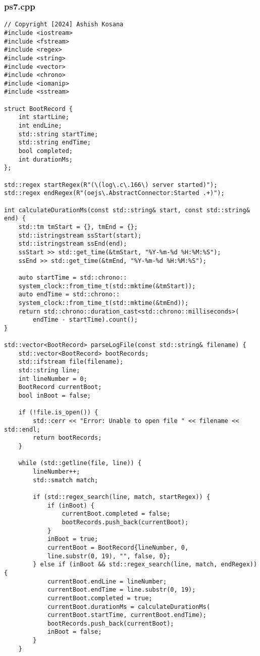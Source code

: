 \documentclass[12pt]{article}
\begin{document}
\subsubsection{ps7.cpp}
\begin{lstlisting}[style=cppcode]
// Copyright [2024] Ashish Kosana
#include <iostream>
#include <fstream>
#include <regex>
#include <string>
#include <vector>
#include <chrono>
#include <iomanip>
#include <sstream>

struct BootRecord {
    int startLine;
    int endLine;
    std::string startTime;
    std::string endTime;
    bool completed;
    int durationMs;
};

std::regex startRegex(R"(\(log\.c\.166\) server started)");
std::regex endRegex(R"(oejs\.AbstractConnector:Started .+)");

int calculateDurationMs(const std::string& start, const std::string& end) {
    std::tm tmStart = {}, tmEnd = {};
    std::istringstream ssStart(start);
    std::istringstream ssEnd(end);
    ssStart >> std::get_time(&tmStart, "%Y-%m-%d %H:%M:%S");
    ssEnd >> std::get_time(&tmEnd, "%Y-%m-%d %H:%M:%S");

    auto startTime = std::chrono::
    system_clock::from_time_t(std::mktime(&tmStart));
    auto endTime = std::chrono::
    system_clock::from_time_t(std::mktime(&tmEnd));
    return std::chrono::duration_cast<std::chrono::milliseconds>(
        endTime - startTime).count();
}

std::vector<BootRecord> parseLogFile(const std::string& filename) {
    std::vector<BootRecord> bootRecords;
    std::ifstream file(filename);
    std::string line;
    int lineNumber = 0;
    BootRecord currentBoot;
    bool inBoot = false;

    if (!file.is_open()) {
        std::cerr << "Error: Unable to open file " << filename << std::endl;
        return bootRecords;
    }

    while (std::getline(file, line)) {
        lineNumber++;
        std::smatch match;

        if (std::regex_search(line, match, startRegex)) {
            if (inBoot) {
                currentBoot.completed = false;
                bootRecords.push_back(currentBoot);
            }
            inBoot = true;
            currentBoot = BootRecord{lineNumber, 0,
            line.substr(0, 19), "", false, 0};
        } else if (inBoot && std::regex_search(line, match, endRegex)) {
            currentBoot.endLine = lineNumber;
            currentBoot.endTime = line.substr(0, 19);
            currentBoot.completed = true;
            currentBoot.durationMs = calculateDurationMs(
            currentBoot.startTime, currentBoot.endTime);
            bootRecords.push_back(currentBoot);
            inBoot = false;
        }
    }


\end{lstlisting}
\end{document}
